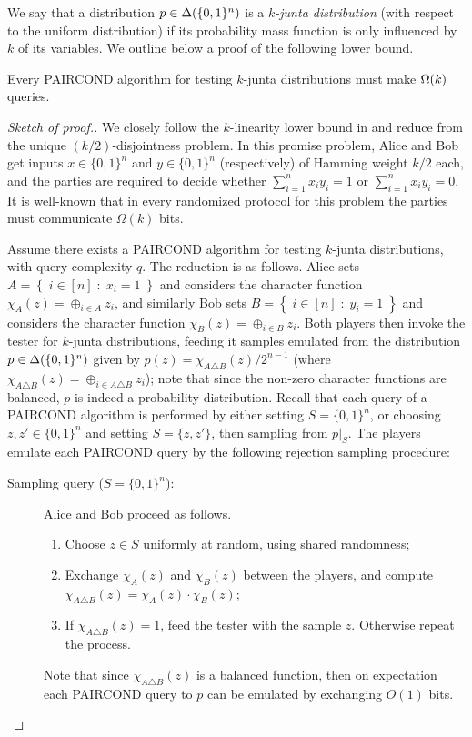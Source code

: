 \documentclass[11pt]{article}
\theoremstyle{remark}   	\newtheorem{remark}[theorem]{Remark}
\theoremstyle{definition}   	\newaliascnt{defn}{theorem}
\newcommand{\bigOmega}[1]{{\Omega\mleft( #1 \mright)}}
\newcommand{\setOfSuchThat}[2]{ \left\{\; #1 \;\colon\; #2\; \right\} } 			\newcommand{\indicSet}[1]{\mathds{1}_{#1}}                                              \newcommand{\indic}[1]{\indicSet{\left\{#1\right\}}}                                             \newcommand{\disjunion}{\amalg}
\newcommand{\PCOND}{{\sf PAIRCOND}\xspace}
\newcommand{\bitset}{\ensuremath{\{0,1\}}}
\begin{document}
We say that a distribution $p \in\distribs{\bitset^n}$ is a \emph{$k$-junta distribution} (with respect to the uniform distribution) if its probability mass function is only influenced by $k$ of its variables. We outline below a proof of the following lower bound.

\begin{theorem}
	Every \PCOND algorithm for testing $k$-junta distributions must make $\bigOmega{k}$ queries.	
\end{theorem}

\begin{proof}[Sketch of proof.]
We closely follow the $k$-linearity lower bound in \cite{BBM12} and reduce from the unique $(k/2)$-disjointness problem. In this promise problem, Alice and Bob get inputs $x\in\bitset^n$ and $y\in\bitset^n$ (respectively) of Hamming weight $k/2$ each, and the parties are required to decide whether $\sum_{i =1}^n x_i y_i = 1$ or $\sum_{i =1}^n x_i y_i = 0$. It is well-known that in every randomized protocol for this problem the parties must communicate $\Omega(k)$ bits.

Assume there exists a \PCOND algorithm for testing $k$-junta distributions, with query complexity $q$. The reduction is as follows. Alice sets $A = \setOfSuchThat{i\in[n]}{x_i = 1}$ and considers the character function $\chi_A(z) = \oplus_{i \in A} z_i$, and similarly Bob sets $B = \setOfSuchThat{i\in[n]}{y_i = 1}$ and considers the character function $\chi_B(z) = \oplus_{i \in B} z_i$. Both players then invoke the tester for $k$-junta distributions, feeding it samples emulated from the distribution $p \in\distribs{\bitset^n}$ given by $p(z) = \chi_{A \triangle B}(z)/2^{n-1}$ (where $\chi_{A \triangle B}(z) = \oplus_{i \in A \triangle B} z_i$); note that since the non-zero character functions are balanced, $p$ is indeed a probability distribution. Recall that each query of a \PCOND algorithm is performed by either setting $S = \bitset^n$, or choosing $z,z'\in\bitset^n$ and setting $S = \{z,z'\}$, then sampling from $p|_S$. The players emulate each \PCOND query by the following rejection sampling procedure: 

\begin{description}
\item[Sampling query ($S=\bitset^n$):] Alice and Bob proceed as follows.
  \begin{enumerate}
	  \item Choose $z \in S$ uniformly at random, using shared randomness;
	  \item Exchange $\chi_A(z)$ and $\chi_B(z)$ between the players, and compute $\chi_{A \triangle B}(z) = \chi_A(z) \cdot \chi_B(z)$;
	  \item If $\chi_{A \triangle B}(z) = 1$, feed the tester with the sample $z$. Otherwise repeat the process.
  \end{enumerate}
Note that since $\chi_{A \triangle B}(z)$ is a balanced function, then on expectation each \PCOND query to $p$ can be emulated by exchanging $O(1)$ bits.


\end{description}
\end{proof}
\end{document}
